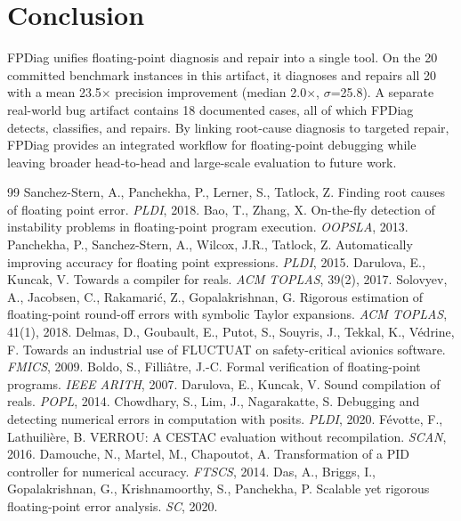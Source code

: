 \documentclass[11pt]{article}
\begin{document}
\section{Conclusion}
FPDiag unifies floating-point diagnosis and repair into a single tool. On the
20 committed benchmark instances in this artifact, it diagnoses and repairs all
20 with a mean 23.5$\times$ precision improvement (median 2.0$\times$,
$\sigma$=25.8). A separate real-world bug artifact contains 18 documented
cases, all of which FPDiag detects, classifies, and repairs. By linking
root-cause diagnosis to targeted repair, FPDiag provides an integrated workflow
for floating-point debugging while leaving broader head-to-head and large-scale
evaluation to future work.


\begin{thebibliography}{99}
 Sanchez-Stern, A., Panchekha, P., Lerner, S., Tatlock, Z. Finding root causes of floating point error. \emph{PLDI}, 2018.
 Bao, T., Zhang, X. On-the-fly detection of instability problems in floating-point program execution. \emph{OOPSLA}, 2013.
 Panchekha, P., Sanchez-Stern, A., Wilcox, J.R., Tatlock, Z. Automatically improving accuracy for floating point expressions. \emph{PLDI}, 2015.
 Darulova, E., Kuncak, V. Towards a compiler for reals. \emph{ACM TOPLAS}, 39(2), 2017.
 Solovyev, A., Jacobsen, C., Rakamari\'{c}, Z., Gopalakrishnan, G. Rigorous estimation of floating-point round-off errors with symbolic Taylor expansions. \emph{ACM TOPLAS}, 41(1), 2018.
 Delmas, D., Goubault, E., Putot, S., Souyris, J., Tekkal, K., V\'{e}drine, F. Towards an industrial use of FLUCTUAT on safety-critical avionics software. \emph{FMICS}, 2009.
 Boldo, S., Filli\^{a}tre, J.-C. Formal verification of floating-point programs. \emph{IEEE ARITH}, 2007.
 Darulova, E., Kuncak, V. Sound compilation of reals. \emph{POPL}, 2014.
 Chowdhary, S., Lim, J., Nagarakatte, S. Debugging and detecting numerical errors in computation with posits. \emph{PLDI}, 2020.
 F\'{e}votte, F., Lathuili\`{e}re, B. VERROU: A CESTAC evaluation without recompilation. \emph{SCAN}, 2016.
 Damouche, N., Martel, M., Chapoutot, A. Transformation of a PID controller for numerical accuracy. \emph{FTSCS}, 2014.
 Das, A., Briggs, I., Gopalakrishnan, G., Krishnamoorthy, S., Panchekha, P. Scalable yet rigorous floating-point error analysis. \emph{SC}, 2020.

\end{thebibliography}
\end{document}
